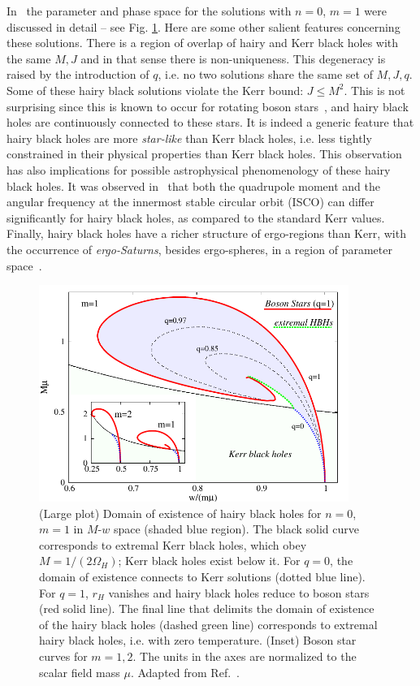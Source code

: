 In~\cite{Herdeiro:2014goa} the parameter and phase space for the solutions with $n=0$, $m=1$ were discussed in detail -- see Fig. \ref{fig:HBH-parameter-space}.
Here are some other salient features concerning these solutions.
There is a region of overlap of hairy and Kerr black holes with the same $M,J$ and in that sense there is non-uniqueness.
This degeneracy is raised by the introduction of $q$, i.e. no two solutions share the same set of $M,J,q$.
Some of these hairy black solutions violate the Kerr bound: $J\le M^2$.
This is not surprising since this is known to occur for rotating boson stars~\cite{Ryan:1996nk}, and hairy black holes are continuously connected to these stars.
It is indeed a generic feature that hairy black holes are more \textit{star-like} than Kerr black holes, i.e. less tightly constrained in their physical properties than Kerr black holes.
This observation has also implications for possible astrophysical phenomenology of these hairy black holes.
It was observed in~\cite{Herdeiro:2014goa} that both the quadrupole moment and the angular frequency at the innermost stable circular orbit (ISCO) can differ significantly for hairy black holes, as compared to the standard Kerr values.
Finally, hairy black holes have a richer structure of ergo-regions than Kerr, with the occurrence of \textit{ergo-Saturns}, besides ergo-spheres, in a region of parameter space~\cite{Herdeiro:2014jaa}.

\begin{figure}[H]
  \begin{center}
  \includegraphics[height=2.78in]{Figs/BH-w-M.pdf}
  \end{center}
  \caption{(Large plot) Domain of existence of hairy black holes for $n=0$, $m=1$ in $M$-$w$ space (shaded blue region). The black solid curve corresponds to extremal Kerr black holes, which obey $M={1}/(2\Omega_H)$; Kerr black holes exist below it. For $q=0$, the domain of existence connects to Kerr solutions (dotted blue line). For $q=1$, $r_H$ vanishes and hairy black holes reduce to boson stars (red solid line). The final line that delimits the domain of existence of the hairy black holes (dashed green line) corresponds to extremal hairy black holes, i.e. with zero temperature. (Inset) Boson star curves for $m=1,2$. The units in the axes are normalized to the scalar field mass $\mu$. Adapted from Ref.~\cite{Herdeiro:2014goa}.}
  \label{fig:HBH-parameter-space}
\end{figure}

